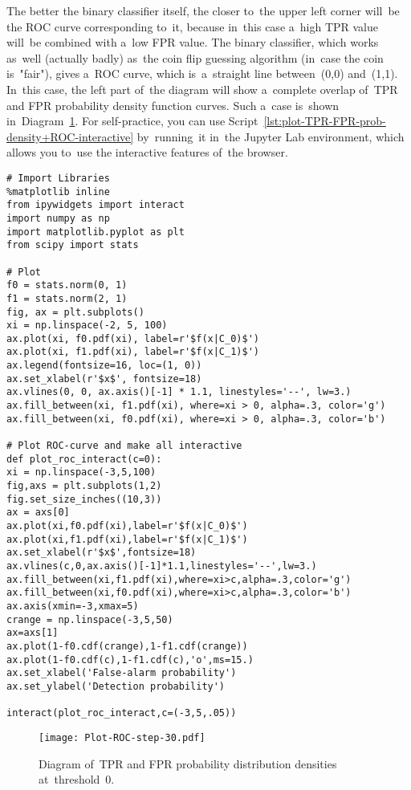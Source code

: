 \documentclass[]{scrreprt}
\begin{document}
The better the binary classifier itself, the closer to~the upper left corner will~be the ROC curve corresponding to~it, because in~this case a~high TPR value will~be combined with a~low FPR value. The binary classifier, which works as~well (actually badly) as~the coin flip guessing algorithm (in~case the coin is~"fair"), gives a~ROC curve, which is~a~straight line between~(0,0) and~(1,1). In~this case, the left part of~the diagram will show a~complete overlap of~TPR and FPR probability density function curves. Such a~case is~shown in~Diagram~\ref{fig:plot-TPR-FPR-prob-density-3}. For self-practice, you can use Script~\ref{lst:plot-TPR-FPR-prob-density+ROC-interactive} by~running~it in~the Jupyter Lab environment, which allows you to~use the interactive features of~the browser.
%
\begin{lstlisting}[float, caption = Build an~interactive graph of~TPR and FPR distribution density and its corresponding ROC curve for a~given threshold value, firstnumber=1, label= lst:plot-TPR-FPR-prob-density+ROC-interactive]
# Import Libraries
%matplotlib inline
from ipywidgets import interact
import numpy as np
import matplotlib.pyplot as plt
from scipy import stats

# Plot
f0 = stats.norm(0, 1)
f1 = stats.norm(2, 1)
fig, ax = plt.subplots()
xi = np.linspace(-2, 5, 100)
ax.plot(xi, f0.pdf(xi), label=r'$f(x|C_0)$')
ax.plot(xi, f1.pdf(xi), label=r'$f(x|C_1)$')
ax.legend(fontsize=16, loc=(1, 0))
ax.set_xlabel(r'$x$', fontsize=18)
ax.vlines(0, 0, ax.axis()[-1] * 1.1, linestyles='--', lw=3.)
ax.fill_between(xi, f1.pdf(xi), where=xi > 0, alpha=.3, color='g')
ax.fill_between(xi, f0.pdf(xi), where=xi > 0, alpha=.3, color='b')

# Plot ROC-curve and make all interactive
def plot_roc_interact(c=0):
xi = np.linspace(-3,5,100)
fig,axs = plt.subplots(1,2)
fig.set_size_inches((10,3))
ax = axs[0]
ax.plot(xi,f0.pdf(xi),label=r'$f(x|C_0)$')
ax.plot(xi,f1.pdf(xi),label=r'$f(x|C_1)$')
ax.set_xlabel(r'$x$',fontsize=18)
ax.vlines(c,0,ax.axis()[-1]*1.1,linestyles='--',lw=3.)
ax.fill_between(xi,f1.pdf(xi),where=xi>c,alpha=.3,color='g')
ax.fill_between(xi,f0.pdf(xi),where=xi>c,alpha=.3,color='b')
ax.axis(xmin=-3,xmax=5)
crange = np.linspace(-3,5,50)
ax=axs[1]
ax.plot(1-f0.cdf(crange),1-f1.cdf(crange))
ax.plot(1-f0.cdf(c),1-f1.cdf(c),'o',ms=15.)
ax.set_xlabel('False-alarm probability')
ax.set_ylabel('Detection probability')

interact(plot_roc_interact,c=(-3,5,.05))
\end{lstlisting}
%
\begin{figure}[ht]
	\centering
	\texttt{[image: Plot-ROC-step-30.pdf]}
	\caption{Diagram of~TPR and FPR probability distribution densities at~threshold~0.}
	\label{fig:plot-TPR-FPR-prob-density-3}
\end{figure}
\end{document}
